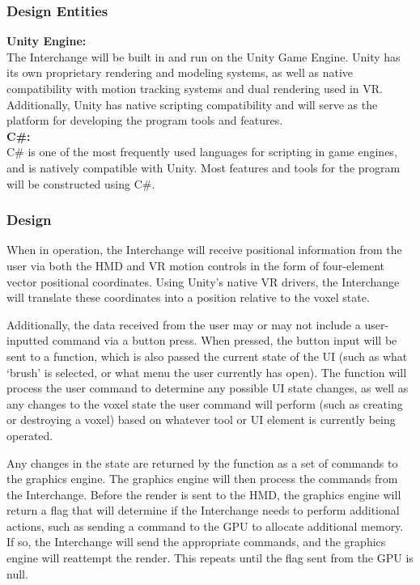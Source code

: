 \documentclass[onecolumn, draftclsnofoot,10pt, compsoc]{IEEEtran}
\begin{document}
\subsubsection{Design Entities}
\textbf{Unity Engine:}\\
The Interchange will be built in and run on the Unity Game Engine. Unity has its own proprietary rendering and modeling systems, as well as native compatibility with motion tracking systems and dual rendering used in VR. Additionally, Unity has native scripting compatibility and will serve as the platform for developing the program tools and features.\cite{unity}\\
\textbf{C\#:}\\
C\# is one of the most frequently used languages for scripting in game engines, and is natively compatible with Unity. Most features and tools for the program will be constructed using C\#. 

\subsubsection{Design}
When in operation, the Interchange will receive positional information from the user via both the HMD and VR motion controls in the form of four-element vector positional coordinates. Using Unity’s native VR drivers, the Interchange will translate these coordinates into a position relative to the voxel state.

Additionally, the data received from the user may or may not include a user-inputted command via a button press. When pressed, the button input will be sent to a function, which is also passed the current state of the UI (such as what ‘brush’ is selected, or what menu the user currently has open). The function will process the user command to determine any possible UI state changes, as well as any changes to the voxel state the user command will perform (such as creating or destroying a voxel) based on whatever tool or UI element is currently being operated. 

Any changes in the state are returned by the function as a set of commands to the graphics engine. The graphics engine will then process the commands from the Interchange. Before the render is sent to the HMD, the graphics engine will return a flag that will determine if the Interchange needs to perform additional actions, such as sending a command to the GPU to allocate additional memory. If so, the Interchange will send the appropriate commands, and the graphics engine will reattempt the render. This repeats until the flag sent from the GPU is null. 
\end{document}
